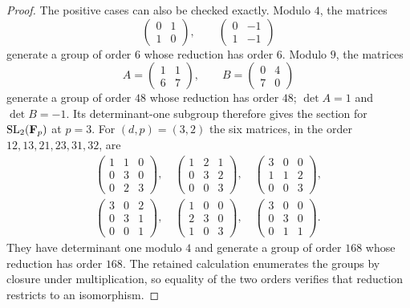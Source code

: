 \begin{proof}
The positive cases can also be checked exactly.  Modulo $4$, the matrices
\[
 \begin{pmatrix}0&1\\1&0\end{pmatrix},\qquad
 \begin{pmatrix}0&-1\\1&-1\end{pmatrix}
\]
generate a group of order $6$ whose reduction has order $6$.  Modulo $9$, the matrices
\[
 A=\begin{pmatrix}1&1\\6&7\end{pmatrix},\qquad
 B=\begin{pmatrix}0&4\\7&0\end{pmatrix}
\]
generate a group of order $48$ whose reduction has order $48$; $\det A=1$ and $\det B=-1$.  Its determinant-one subgroup therefore gives the section for $\operatorname{SL}_2(\mathbf F_p)$ at $p=3$.  For $(d,p)=(3,2)$ the six matrices, in the order $12,13,21,23,31,32$, are
\[
\begin{gathered}
\begin{pmatrix}1&1&0\\0&3&0\\0&2&3\end{pmatrix},\quad
\begin{pmatrix}1&2&1\\0&3&2\\0&0&3\end{pmatrix},\quad
\begin{pmatrix}3&0&0\\1&1&2\\0&0&3\end{pmatrix},\\
\begin{pmatrix}3&0&2\\0&3&1\\0&0&1\end{pmatrix},\quad
\begin{pmatrix}1&0&0\\2&3&0\\1&0&3\end{pmatrix},\quad
\begin{pmatrix}3&0&0\\0&3&0\\0&1&1\end{pmatrix}.
\end{gathered}
\]
They have determinant one modulo $4$ and generate a group of order $168$ whose reduction has order $168$.  The retained calculation enumerates the groups by closure under multiplication, so equality of the two orders verifies that reduction restricts to an isomorphism.


\end{proof}
